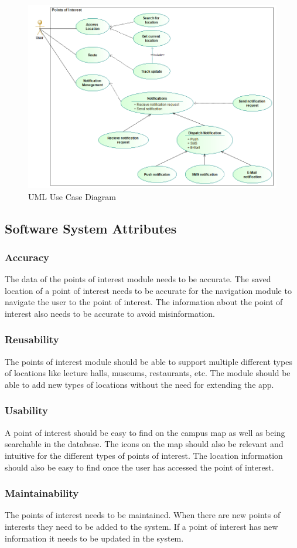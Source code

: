 \begin{figure}[H]\includegraphics[width=\textwidth]{UseCaseDiagram}
\caption{UML Use Case Diagram}
\end{figure}
	
\subsection{Software System Attributes}
    \subsubsection{Accuracy}
        The data of the points of interest module needs to be accurate. The saved location of a point of interest needs to be accurate for the navigation module to navigate the user to the point of interest. The information about the point of interest also needs to be accurate to avoid misinformation.
    \subsubsection{Reusability}
        The points of interest module should be able to support multiple different types of locations like lecture halls, museums, restaurants, etc. The module should be able to add new types of locations without the need for extending the app.
    \subsubsection{Usability}
        A point of interest should be easy to find on the campus map as well as being searchable in the database. The icons on the map should also be relevant and intuitive for the different types of points of interest. The location information should also be easy to find once the user has accessed the point of interest. 
    \subsubsection{Maintainability}
        The points of interest needs to be maintained. When there are new points of interests they need to be added to the system. If a point of interest has new information it needs to be updated in the system.
